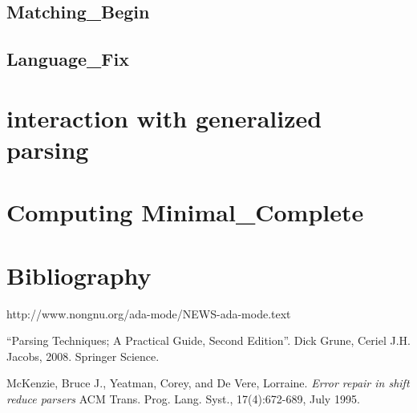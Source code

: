 \documentclass{article}
\begin{document}

\subsection{Matching\_Begin}

\subsection{Language\_Fix}

\section{interaction with generalized parsing}
\section{Computing Minimal\_Complete}
\label{minimal-complete-compute}

\section{Bibliography}
\begin{thebibliography}{9}

 http://www.nongnu.org/ada-mode/NEWS-ada-mode.text

 ``Parsing Techniques; A Practical Guide, Second
  Edition''. Dick Grune, Ceriel J.H. Jacobs, 2008. Springer Science.

 McKenzie, Bruce J., Yeatman, Corey, and De
  Vere, Lorraine.
  \textit{Error repair in shift reduce parsers} ACM Trans. Prog.
  Lang. Syst., 17(4):672-689, July 1995.
\end{thebibliography}
\end{document}
